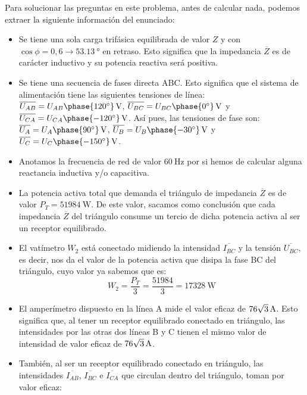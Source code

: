 \documentclass[a4paper,11pt]{article}
\begin{document}
Para solucionar las preguntas en este problema, antes de calcular nada, podemos extraer la siguiente información del enunciado:
\begin{itemize} %
    \item Se tiene una sola carga trifásica equilibrada de valor $Z$ y con $\cos{\phi}=0,6\rightarrow \SI{53.13}{\degree}$ en retraso. Esto significa que la impedancia $\overline{Z}$ es de carácter inductivo y su potencia reactiva será positiva.
    \item 	Se tiene una secuencia de fases directa ABC. Esto significa que el sistema de alimentación tiene las siguientes tensiones de línea: $\overline{U_{AB}}=\SI[parse-numbers=false]{U_{AB}\phase{\SI{120}{\degree}}}{\volt}$, $\overline{U_{BC}}=\SI[parse-numbers=false]{U_{BC}\phase{\SI{0}{\degree}}}{\volt}$ y $\overline{U_{CA}}=\SI[parse-numbers=false]{U_{CA}\phase{\SI{-120}{\degree}}}{\volt}$. Así pues, las tensiones de fase son: $\overline{U_{A}}=\SI[parse-numbers=false]{U_{A}\phase{\SI{90}{\degree}}}{\volt}$, $\overline{U_{B}}=\SI[parse-numbers=false]{U_{B}\phase{\SI{-30}{\degree}}}{\volt}$ y $\overline{U_{C}}=\SI[parse-numbers=false]{U_{C}\phase{\SI{-150}{\degree}}}{\volt}$.
    \item Anotamos la frecuencia de red de valor $\SI{60}{\hertz}$ por si hemos de calcular alguna reactancia inductiva y/o capacitiva.
    \item La potencia activa total que demanda el triángulo de impedancia $\overline{Z}$ es de valor $P_T=\SI{51984}{\watt}$. De este valor, sacamos como conclusión que cada impedancia $\overline{Z}$ del triángulo consume un tercio de dicha potencia activa al ser un receptor equilibrado.
    \item El vatímetro $W_2$ está conectado midiendo la intensidad $\overline{I_{BC}}$ y la tensión $\overline{U_{BC}}$, es decir, nos da el valor de la potencia activa que disipa la fase BC del triángulo, cuyo valor ya sabemos que es:
    \[
        W_2=\dfrac{P_T}{3}=\dfrac{51984}{3}=\SI{17328}{\watt}
    \]
    \item El amperímetro dispuesto en la línea A mide el valor eficaz de $\SI[parse-numbers=false]{76\sqrt{3}}{\ampere}$. Esto significa que, al tener un receptor equilibrado conectado en triángulo, las intensidades por las otras dos líneas B y C tienen el mismo valor de intensidad de valor eficaz de $\SI[parse-numbers=false]{76\sqrt{3}}{\ampere}$.
    \item También, al ser un receptor equilibrado conectado en triángulo, las intensidades $\overline{I_{AB}}$, $\overline{I_{BC}}$ e $\overline{I_{CA}}$ que circulan dentro del triángulo, toman por valor eficaz:

\end{itemize}
\end{document}
